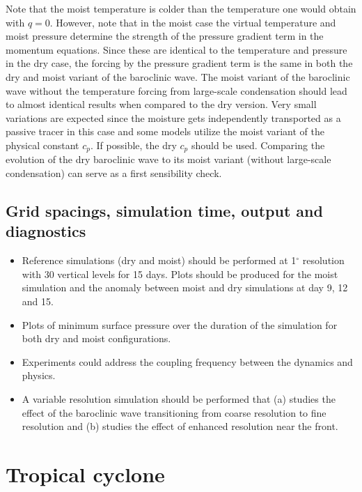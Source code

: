 \documentclass[times,doublespace]{fldauth}
\begin{document}
Note that the moist temperature is colder than the temperature one would obtain with $q = 0$. However, note that in the moist case the virtual temperature and moist pressure determine the strength of the pressure gradient term in the momentum equations. Since these are identical to the temperature and pressure in the dry case, the forcing by the pressure gradient term is the same in both the dry and moist variant of the baroclinic wave. The moist variant of the baroclinic wave without the temperature forcing from large-scale condensation should lead to almost identical results when compared to the dry version. Very small variations are expected since the moisture gets independently transported as a passive tracer in this case and some models utilize the moist variant of the physical constant $c_p$. If possible, the dry $c_p$ should be used. Comparing the evolution of the dry baroclinic wave to its moist variant (without large-scale condensation) can serve as a first sensibility check.

\subsection{Grid spacings, simulation time, output and diagnostics}

\begin{itemize}
\item Reference simulations (dry and moist) should be performed at 1$^\circ$ resolution with 30 vertical levels for 15 days.  Plots should be produced for the moist simulation and the anomaly between moist and dry simulations at day 9, 12 and 15.
\item Plots of minimum surface pressure over the duration of the simulation for both dry and moist configurations.
\item Experiments could address the coupling frequency between the dynamics and physics.
\item A variable resolution simulation should be performed that (a) studies the effect of the baroclinic wave transitioning from coarse resolution to fine resolution and (b) studies the effect of enhanced resolution near the front.
\end{itemize}

\clearpage

\section{Tropical cyclone} \label{sec:tropical_cyclone}
\end{document}
